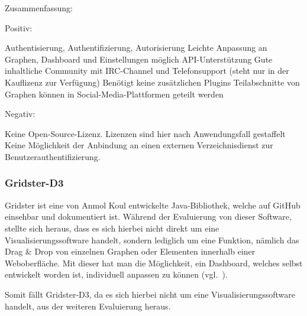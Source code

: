 Zusammenfassung:

Positiv:

\begin{outline}
  \1 Authentisierung, Authentifizierung, Autorisierung
  \1 Leichte Anpassung an Graphen, Dashboard und Einstellungen möglich
  \1 API\hyp{}Unterstützung
  \1 Gute inhaltliche Community mit IRC\hyp{}Channel und Telefonsupport (steht
  nur in der Kauflizenz zur Verfügung)
  \1 Benötigt keine zusätzlichen Plugins
  \1 Teilabschnitte von Graphen können in Social\hyp{}Media\hyp{}Plattformen
  geteilt werden
\end{outline}

Negativ:

\begin{outline}
  \1 Keine Open\hyp{}Source\hyp{}Lizenz. Lizenzen sind hier nach Anwendungsfall
  gestaffelt
  \1 Keine Möglichkeit der Anbindung an einen externen Verzeichnisdienst zur
  Benutzerauthentifizierung.
\end{outline}
\mr%

\subsubsection{Gridster-D3}
\label{subsubsec:gridster-d3}
Gridster ist eine von Anmol Koul entwickelte Java\hyp{}Bibliothek, welche auf
\gls{GitHub} einsehbar und dokumentiert ist. Während der Evaluierung von dieser
Software, stellte sich heraus, dass es sich hierbei nicht direkt um eine
Visualisierungssoftware handelt, sondern lediglich um eine Funktion, nämlich
das Drag \& Drop von einzelnen Graphen oder Elementen innerhalb einer
Weboberfläche. Mit dieser hat man die Möglichkeit, ein Dashboard, welches
selbst entwickelt worden ist, individuell anpassen zu
können (vgl.~\cite{gridster-d3}).

Somit fällt Gridster\hyp{}D3, da es sich hierbei nicht um eine
Visualisierungssoftware handelt, aus der weiteren Evaluierung heraus.

